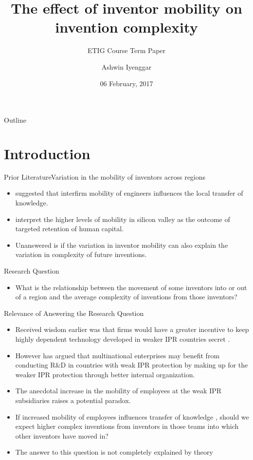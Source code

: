 \documentclass{beamer}
\title{The effect of inventor mobility on  invention complexity}
\subtitle{ETIG Course Term Paper}
\author{Ashwin Iyenggar}
\institute[Indian Institute of Management Bangalore] 
{
  Corporate Strategy and Policy\\
  Indian Institute of Management Bangalore
}
\date{06 February, 2017}
\begin{document}
\begin{frame}
  \titlepage
\end{frame}

\begin{frame}{Outline}
  \tableofcontents
\end{frame}

\section{Introduction}
\begin{frame}{Prior Literature}{Variation in the mobility of inventors across regions}
\begin{itemize}
\item{\cite{Almeida1999} suggested that interfirm mobility of engineers influences the local transfer of knowledge.}
\item{\cite{Ge2016} interpret the higher levels of mobility in silicon valley as the outcome of targeted retention of human capital.}
\item{Unanswered is if the variation in inventor mobility can also explain the variation in complexity of future inventions.}
\end{itemize}
\end{frame}

\begin{frame}{Research Question}{}
\begin{itemize}
\item{What is the relationship between the movement of some inventors into or out of a region and the average complexity of inventions from those inventors?}
\end{itemize}
\end{frame}

\begin{frame}{Relevance of Answering the Research Question}{}
\begin{itemize}
\item{Received wisdom earlier was that firms would have a greater incentive to keep  highly dependent technology developed in weaker IPR countries secret \citep{Cohen2000}.}
\item{However  \cite{Zhao2006} has argued  that multinational enterprises may benefit from conducting R\&D in countries with weak IPR protection by  making up for the weaker IPR protection through better internal organization.}
\item{The anecdotal increase in the mobility of employees at the weak IPR subsidiaries raises a potential paradox.}
\item{If increased mobility of employees influences transfer of knowledge \citep{Almeida1999}, should we expect higher complex inventions from inventors in those teams into which other inventors have moved in?}
\item{The answer to this question is not completely explained by theory}
\end{itemize}
\end{frame}
\end{document}
